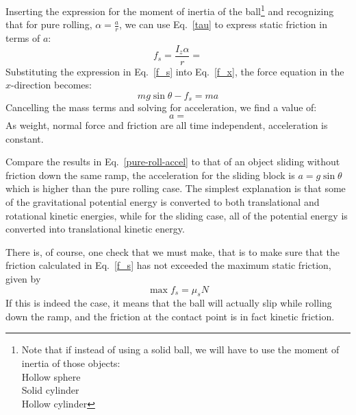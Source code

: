 \documentclass[11pt]{article}
\begin{document}
Inserting the expression for the moment of inertia of the ball\footnote{Note
  that if instead of using a solid ball, we will have to use the moment of
  inertia of
  those objects:\\
  Hollow sphere\\
  Solid cylinder\\
  Hollow cylinder} and recognizing that for pure rolling,
$\displaystyle\alpha=\frac{a}{r}$, we can use Eq.~\ref{tau} to express static
friction in terms of $a$:
\begin{equation}
  f_s=\frac{I_z\alpha}{r}=
  \label{f_s}
\end{equation}
Substituting the expression in Eq.~\ref{f_s} into Eq.~\ref{f_x}, the force
equation in the $x$-direction becomes:
\begin{equation}
  mg\sin\theta-f_s=ma
\end{equation}
Cancelling the mass terms and solving for acceleration, we find a value of:
\begin{equation}
  a=
  \label{pure-roll-accel}
\end{equation}
As weight, normal force and friction are all time independent, acceleration is
constant.

Compare the results in Eq.~\ref{pure-roll-accel} to that of an object sliding
without friction down the same ramp, the acceleration for the sliding block is
$a=g\sin\theta$ which is higher than the pure rolling case. The simplest
explanation is that some of the gravitational potential energy is converted to
both translational and rotational kinetic energies, while for the sliding case,
all of the potential energy is converted into translational kinetic energy.

There is, of course, one check that we must make, that is to make sure that the
friction calculated in Eq.~\ref{f_s} has not exceeded the maximum static
friction, given by
\begin{equation}
  \max f_s=\mu_s N
\end{equation}
If this is indeed the case, it means that the ball will actually slip while
rolling down the ramp, and the friction at the contact point is in fact kinetic
friction.
\end{document}
